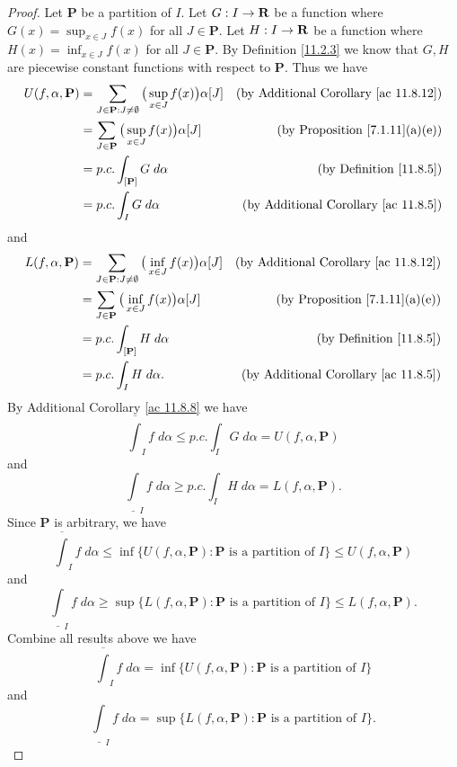 \begin{proof}
    Let \(\mathbf{P}\) be a partition of \(I\).
    Let \(G : I \to \mathbf{R}\) be a function where \(G(x) = \sup_{x \in J} f(x)\) for all \(J \in \mathbf{P}\).
    Let \(H : I \to \mathbf{R}\) be a function where \(H(x) = \inf_{x \in J} f(x)\) for all \(J \in \mathbf{P}\).
    By Definition \ref{11.2.3} we know that \(G, H\) are piecewise constant functions with respect to \(\mathbf{P}\).
    Thus we have
    \begin{align*}
        U(f, \alpha, \mathbf{P}) & = \sum_{J \in \mathbf{P} : J \neq \emptyset} \big(\sup_{x \in J} f(x)\big) \alpha[J] & \text{(by Additional Corollary \ref{ac 11.8.12})} \\
                                 & = \sum_{J \in \mathbf{P}} \big(\sup_{x \in J} f(x)\big) \alpha[J]                    & \text{(by Proposition \ref{7.1.11}(a)(e))}        \\
                                 & = p.c. \int_{[\mathbf{P}]} G \; d \alpha                                             & \text{(by Definition \ref{11.8.5})}               \\
                                 & = p.c. \int_I G \; d \alpha                                                          & \text{(by Additional Corollary \ref{ac 11.8.5})}
    \end{align*}
    and
    \begin{align*}
        L(f, \alpha, \mathbf{P}) & = \sum_{J \in \mathbf{P} : J \neq \emptyset} \big(\inf_{x \in J} f(x)\big) \alpha[J] & \text{(by Additional Corollary \ref{ac 11.8.12})} \\
                                 & = \sum_{J \in \mathbf{P}} \big(\inf_{x \in J} f(x)\big) \alpha[J]                    & \text{(by Proposition \ref{7.1.11}(a)(e))}        \\
                                 & = p.c. \int_{[\mathbf{P}]} H \; d \alpha                                             & \text{(by Definition \ref{11.8.5})}               \\
                                 & = p.c. \int_I H \; d \alpha.                                                         & \text{(by Additional Corollary \ref{ac 11.8.5})}
    \end{align*}
    By Additional Corollary \ref{ac 11.8.8} we have
    \[
        \overline{\int}_I f \; d \alpha \leq p.c. \int_I G \; d \alpha = U(f, \alpha, \mathbf{P})
    \]
    and
    \[
        \underline{\int}_I f \; d \alpha \geq p.c. \int_I H \; d \alpha = L(f, \alpha, \mathbf{P}).
    \]
    Since \(\mathbf{P}\) is arbitrary, we have
    \[
        \overline{\int}_I f \; d \alpha \leq \inf\big\{U(f, \alpha, \mathbf{P}) : \mathbf{P} \text{ is a partition of } I\big\} \leq U(f, \alpha, \mathbf{P})
    \]
    and
    \[
        \underline{\int}_I f \; d \alpha \geq \sup\big\{L(f, \alpha, \mathbf{P}) : \mathbf{P} \text{ is a partition of } I\big\} \leq L(f, \alpha, \mathbf{P}).
    \]
    Combine all results above we have
    \[
        \overline{\int}_I f \; d \alpha = \inf\big\{U(f, \alpha, \mathbf{P}) : \mathbf{P} \text{ is a partition of } I\big\}
    \]
    and
    \[
        \underline{\int}_I f \; d \alpha = \sup\big\{L(f, \alpha, \mathbf{P}) : \mathbf{P} \text{ is a partition of } I\big\}.
    \]
\end{proof}

